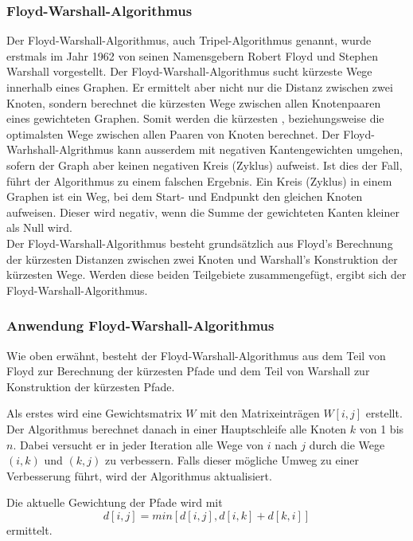 \subsubsection{Floyd-Warshall-Algorithmus}
Der Floyd-Warshall-Algorithmus, auch Tripel-Algorithmus genannt, wurde erstmals im Jahr 1962 von seinen Namensgebern Robert Floyd und Stephen Warshall vorgestellt.
Der Floyd-Warshall-Algorithmus sucht kürzeste Wege innerhalb eines Graphen. Er ermittelt aber nicht nur die Distanz zwischen zwei Knoten, sondern berechnet die kürzesten Wege zwischen allen Knotenpaaren eines gewichteten Graphen. Somit werden die kürzesten , beziehungsweise die optimalsten Wege zwischen allen Paaren von Knoten berechnet. Der Floyd-Warhshall-Algrithmus kann ausserdem mit negativen Kantengewichten umgehen, sofern der Graph aber keinen negativen Kreis (Zyklus) aufweist. Ist dies der Fall, führt der Algorithmus zu einem falschen Ergebnis.
Ein Kreis (Zyklus) in einem Graphen ist ein Weg, bei dem Start- und Endpunkt den gleichen Knoten aufweisen. Dieser wird negativ, wenn die Summe der gewichteten Kanten kleiner als Null wird.\\
Der Floyd-Warshall-Algorithmus besteht grundsätzlich aus Floyd's Berechnung der kürzesten Distanzen zwischen zwei Knoten und Warshall's Konstruktion der kürzesten Wege. Werden diese beiden Teilgebiete zusammengefügt, ergibt sich der Floyd-Warshall-Algorithmus.

\subsubsection{Anwendung Floyd-Warshall-Algorithmus}

Wie oben erwähnt, besteht der Floyd-Warshall-Algorithmus aus dem Teil von Floyd zur Berechnung der kürzesten Pfade und dem Teil von Warshall zur Konstruktion der kürzesten Pfade.

Als erstes wird eine Gewichtsmatrix $W$ mit den Matrixeinträgen $W[i, j]$ erstellt.
Der Algorithmus berechnet danach in einer Hauptschleife alle Knoten $k$ von 1 bis $n$.
Dabei versucht er in jeder Iteration alle Wege von $i$ nach $j$ durch die Wege $(i, k)$ und $(k, j)$ zu verbessern.
Falls dieser mögliche Umweg zu einer Verbesserung führt, wird der Algorithmus aktualisiert.

Die aktuelle Gewichtung der Pfade wird mit
\begin{equation}d[i, j]=min[d[i,j], d[i,k] + d[k,i]]\end{equation}
ermittelt.

